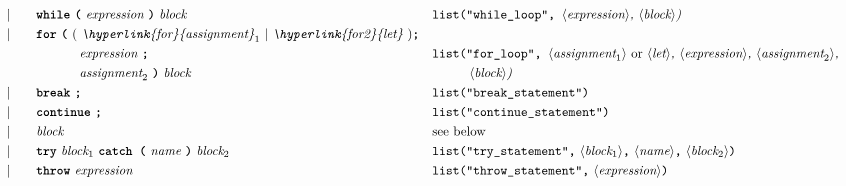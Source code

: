 \begin{alignat*}{9}
&&                       && |   &\quad && \textbf{\texttt{while}}\
                                   \textbf{\texttt{(}}\  \textit{expression} \ \textbf{\texttt{)}} \
                                   \textit{block}
                                                           && \texttt{list("while\_loop",  } \langle \textit{expression}\rangle \textit{,  } \langle \textit{block}\rangle \textit{)} \\
&&                       && |   &\quad && \textbf{\texttt{for}}\ \textbf{\texttt{(}} \
                                          (\ \textit{\hyperlink{for}{assignment}}_1 \ | \  \textit{\hyperlink{for2}{let}}\ ) \textbf{\texttt{;}} \\
&&                       &&     &\quad && \ \ \ \ \ \ \ \ \ \ \textit{expression} \ \textbf{\texttt{;}} && \texttt{list("for\_loop",  } \langle \textit{assignment}_1\rangle\ \textrm{or}\ \langle \textit{let}\rangle \textit{,  } \langle \textit{expression}\rangle \textit{,  } \langle \textit{assignment}_2\rangle \textit{,}\\
&&                       &&     &\quad && \ \ \ \ \ \ \ \ \ \ \textit{assignment}_2 \ \textbf{\texttt{)}} \  \textit{block}
                                            && \texttt{ }\ \ \ \ \ \ \ \langle \textit{block}\rangle \textit{)} \\
&&                       && |   &\quad && \textbf{\texttt{break}}\ \textbf{\texttt{;}}
                                                           && \texttt{list("break\_statement")} \\
&&                       && |   &\quad && \textbf{\texttt{continue}}\ \textbf{\texttt{;}}
                                                           && \texttt{list("continue\_statement")} \\
&&                       && |   &\quad &&  \textit{block}
                                                           && \textrm{see below}\\
&&                       && |   &\quad &&  \textbf{\texttt{try}}\ \textit{block}_1 \ \textbf{\texttt{catch (}}\ \textit{name}\ \textbf{\texttt{)}}\ \textit{block}_2
                                                           && \texttt{list("try\_statement",}\ \langle  \textit{block}_1 \rangle \texttt{,}\ \langle  \textit{name} \rangle \texttt{,}\ \langle  \textit{block}_2 \rangle \texttt{)} \\
&&                       && |   &\quad &&  \textbf{\texttt{throw}}\ \textit{expression}
                                                           && \texttt{list("throw\_statement",}\ \langle  \textit{expression} \rangle \texttt{)} \\

\end{alignat*}

